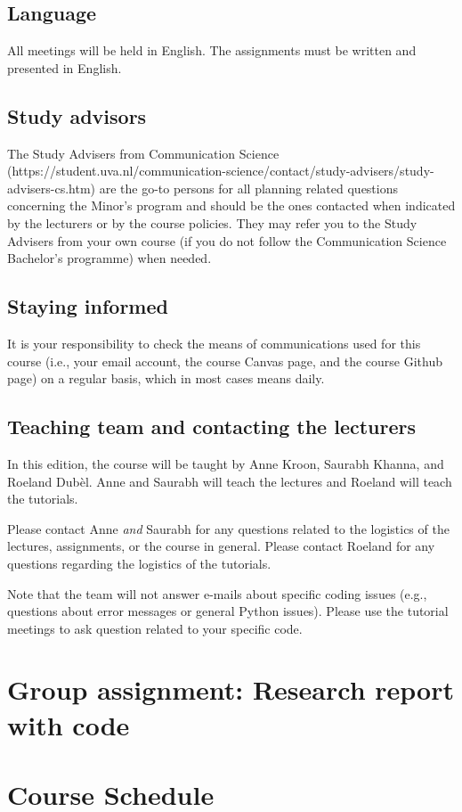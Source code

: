 \documentclass[a4paper,10pt]{report}
\begin{document}
\section{Language}
All meetings will be held in English. The assignments must be written and presented in English. 

\section{Study advisors}
The Study Advisers from Communication Science (https://student.uva.nl/communication-science/contact/study-advisers/study-advisers-cs.htm) are the go-to persons for all planning related questions concerning the Minor’s program and should be the ones contacted when indicated by the lecturers or by the course policies. They may refer you to the Study Advisers from your own course (if you do not follow the Communication Science Bachelor’s programme) when needed. 

\section{Staying informed}
It is your responsibility to check the means of communications used for this course (i.e., your email account, the course Canvas page, and the course Github page) on a regular basis, which in most cases means daily. 

\section{Teaching team and contacting the lecturers}
In this edition, the course will be taught by Anne Kroon, Saurabh Khanna, and Roeland Dubèl. Anne and Saurabh will teach the lectures and Roeland will teach the tutorials.

Please contact Anne \emph{and} Saurabh for any questions related to the logistics of the lectures, assignments, or the course in general.
Please contact Roeland for any questions regarding the logistics of the tutorials. 

Note that the team will not answer e-mails about specific coding issues (e.g., questions about error messages or general Python issues). Please use the tutorial meetings to ask question related to your specific code.

\chapter{Group assignment: Research report with code}
\label{sec:groupassignment}


\chapter{Course Schedule}





\end{document}
